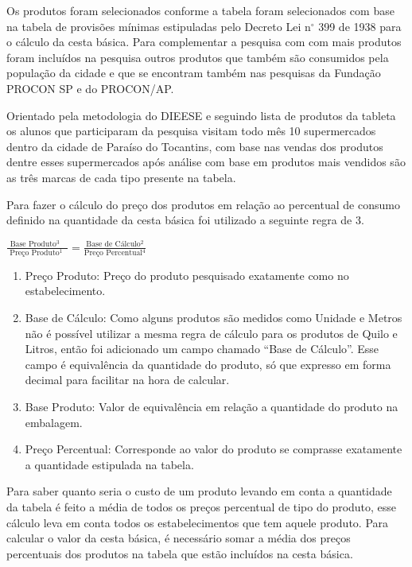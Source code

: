 \documentclass{ifto-tex}
\begin{document}
Os produtos foram selecionados conforme a tabela  foram selecionados com base na tabela de provisões mínimas estipuladas pelo Decreto Lei n$^{\circ}$ 399 de 1938 para o cálculo da cesta básica. Para complementar a pesquisa com com mais produtos foram incluídos na pesquisa outros produtos que também são consumidos pela população da cidade e que se encontram também nas pesquisas da Fundação PROCON SP e do PROCON/AP.

Orientado pela metodologia do DIEESE e seguindo lista de produtos da tableta os alunos que participaram da pesquisa visitam todo mês 10 supermercados dentro da cidade de Paraíso do Tocantins, com base nas vendas dos produtos dentre esses supermercados após análise com base em produtos mais vendidos são as três marcas de cada tipo presente na tabela.

Para fazer o cálculo do preço dos produtos em relação ao percentual de consumo definido na quantidade da cesta básica foi utilizado a seguinte regra de 3.

\begin{center}	
$\displaystyle\frac{\mbox {Base Produto$^{3}$ }}{\mbox { Preço Produto$^{1}$ }}=\frac{\mbox {Base de Cálculo$^{2}$} }{\mbox {Preço Percentual$^{4}$}}$
\end{center}
	
	\begin{enumerate}
	\item Preço Produto: Preço do produto pesquisado exatamente como no estabelecimento.
	\item Base de Cálculo: Como alguns produtos são medidos como Unidade e Metros não é possível utilizar a mesma regra de cálculo para os produtos de Quilo e Litros, então foi adicionado um campo chamado “Base de Cálculo”. Esse campo é equivalência da quantidade do produto, só que expresso em forma decimal para facilitar na hora de calcular.
	\item Base Produto: Valor de equivalência em relação a quantidade do produto na embalagem.
	\item Preço Percentual: Corresponde ao valor do produto se comprasse exatamente a quantidade estipulada na tabela.
	
\end{enumerate}

	Para saber quanto seria o custo de um produto levando em conta a quantidade da tabela é feito a média de todos os preços percentual de tipo do produto, esse cálculo leva em conta todos os estabelecimentos que tem aquele produto. Para calcular o valor da cesta básica, é necessário somar a média dos preços percentuais dos produtos na tabela que estão incluídos na cesta básica.
	
\end{document}
